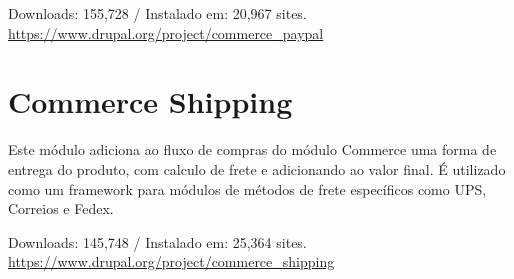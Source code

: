 \begin{center}
  Downloads: 155,728 / Instalado em: 20,967 sites.
  \url{https://www.drupal.org/project/commerce_paypal}
\end{center}

\section{Commerce Shipping}
Este módulo adiciona ao fluxo de compras do módulo Commerce uma forma de entrega do produto, com calculo de frete e adicionando ao valor final. É utilizado como um framework para módulos de métodos de frete específicos como UPS, Correios e Fedex.

\begin{center}
  Downloads: 145,748 / Instalado em: 25,364 sites.
  \url{https://www.drupal.org/project/commerce_shipping}
\end{center}


